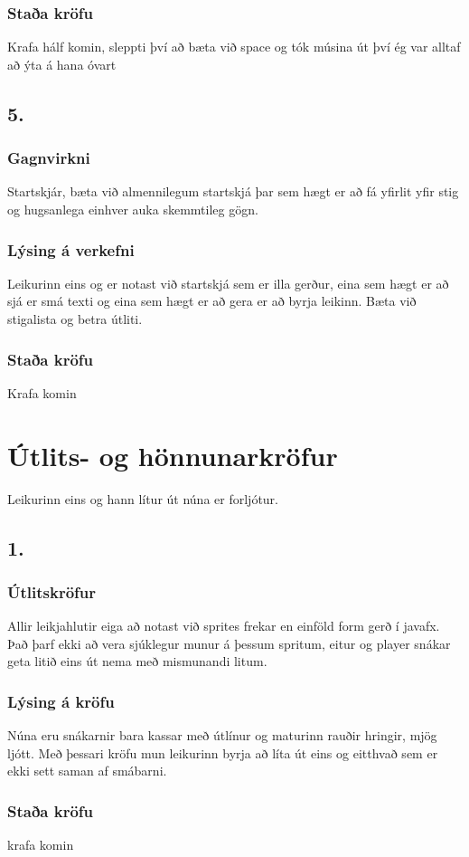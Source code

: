 \documentclass{article}
\begin{document}
\subsubsection*{Staða kröfu}
    Krafa hálf komin, sleppti því að bæta við space og tók músina út því ég var alltaf að ýta á hana óvart

\subsection*{5.}
\subsubsection*{Gagnvirkni}
Startskjár, 
bæta við almennilegum startskjá þar sem hægt er að fá yfirlit yfir stig 
og hugsanlega einhver auka skemmtileg gögn.

\subsubsection*{Lýsing á verkefni}
Leikurinn eins og er notast við startskjá sem er illa gerður, 
eina sem hægt er að sjá er smá texti og eina sem hægt er að gera er að byrja leikinn.
Bæta við stigalista og betra útliti.

\subsubsection*{Staða kröfu}
    Krafa komin

\section*{Útlits- og hönnunarkröfur}
Leikurinn eins og hann lítur út núna er forljótur.
\subsection*{1.}
\subsubsection*{Útlitskröfur}
Allir leikjahlutir eiga að notast við sprites frekar en einföld form gerð í javafx.
Það þarf ekki að vera sjúklegur munur á þessum spritum, 
eitur og player snákar geta litið eins út nema með mismunandi litum.

\subsubsection*{Lýsing á kröfu}
Núna eru snákarnir bara kassar með útlínur og maturinn rauðir hringir, mjög ljótt.
Með þessari kröfu mun leikurinn byrja að líta út eins og eitthvað sem er ekki sett saman af smábarni.

\subsubsection*{Staða kröfu}
krafa komin
\end{document}
